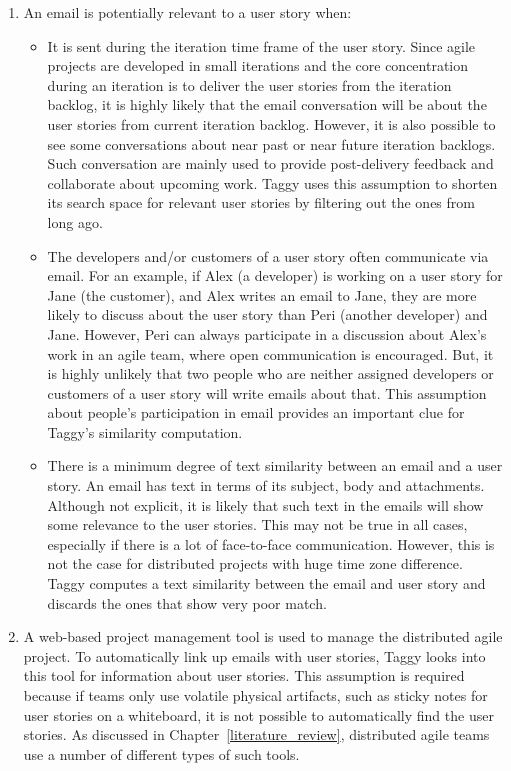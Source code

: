 \begin{enumerate}
	\item An email is potentially relevant to a user story when:
		\begin{itemize}
			\item It is sent during the iteration time frame of the user story. Since agile projects are developed in small iterations and the core concentration during an iteration is to deliver the user stories from the iteration backlog, it is highly likely that the email conversation will be about the user stories from current iteration backlog. However, it is also possible to see some conversations about near past or near future iteration backlogs. Such conversation are mainly used to provide post-delivery feedback and collaborate about upcoming work. Taggy uses this assumption to shorten its search space for relevant user stories by filtering out the ones from long ago.
			
			\item The developers and/or customers of a user story often communicate via email. For an example, if Alex (a developer) is working on a user story for Jane (the customer), and Alex writes an email to Jane, they are more likely to discuss about the user story than Peri (another developer) and Jane. However, Peri can always participate in a discussion about Alex's work in an agile team, where open communication is encouraged. But, it is highly unlikely that two people who are neither assigned developers or customers of a user story will write emails about that. This assumption about people's participation in email provides an important clue for Taggy's similarity computation.
			
			\item There is a minimum degree of text similarity between an email and a user story. An email has text in terms of its subject, body and attachments. Although not explicit, it is likely that such text in the emails will show some relevance to the user stories. This may not be true in all cases, especially if there is a lot of face-to-face communication. However, this is not the case for distributed projects with huge time zone difference. Taggy computes a text similarity between the email and user story and discards the ones that show very poor match.
		\end{itemize}
	 \item A web-based project management tool is used to manage the distributed agile project. To automatically link up emails with user stories, Taggy looks into this tool for information about user stories. This assumption is required because if teams only use volatile physical artifacts, such as sticky notes for user stories on a whiteboard, it is not possible to automatically find the user stories. As discussed in Chapter~\ref{literature_review}, distributed agile teams use a number of different types of such tools.
	

\end{enumerate}
